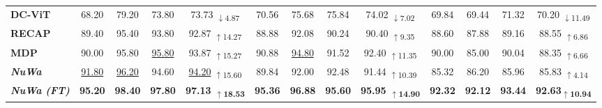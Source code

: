 \begin{table}[t]
\begin{scriptsize}
\begin{tabular}{l||ccc|c||ccc|c||ccc|c}
\textbf{DC-ViT} & 68.20 & 79.20 & 73.80 & 73.73 \textsubscript{\textcolor{downblue}{$\downarrow$4.87}} & 70.56 & 75.68 & 75.84 & 74.02 \textsubscript{\textcolor{downblue}{$\downarrow$7.02}} & 69.84 & 69.44 & 71.32 & 70.20 \textsubscript{\textcolor{downblue}{$\downarrow$11.49}}\\
\rowcolor[gray]{0.95}
\textbf{RECAP} & 89.40 & 95.40 & 93.80 & 92.87 \textsubscript{\textcolor{upred}{$\uparrow$14.27}} & 88.88 & 92.08 & 90.24 & 90.40 \textsubscript{\textcolor{upred}{$\uparrow$9.35}} & 88.60 & 87.88 & 89.16 & 88.55 \textsubscript{\textcolor{upred}{$\uparrow$6.86}}\\
\textbf{MDP} & 90.00 & 95.80 & \underline{95.80} & 93.87 \textsubscript{\textcolor{upred}{$\uparrow$15.27}} & 90.88 & \underline{94.80} & 91.52 & 92.40 \textsubscript{\textcolor{upred}{$\uparrow$11.35}} & 90.00 & 85.00 & 90.04 & 88.35 \textsubscript{\textcolor{upred}{$\uparrow$6.66}}\\
\hline\rowcolor[HTML]{FFF2E0}
\textbf{\textit{NuWa}} & \underline{91.80} & \underline{96.20} & 94.60 & \underline{94.20} \textsubscript{\textcolor{upred}{$\uparrow$15.60}} & 89.84 & 92.00 & 92.48 & 91.44 \textsubscript{\textcolor{upred}{$\uparrow$10.39}} & 85.32 & 86.20 & 85.96 & 85.83 \textsubscript{\textcolor{upred}{$\uparrow$4.14}}\\
\rowcolor[HTML]{FFF6E2}
\textbf{\textit{NuWa (FT)}} & \textbf{95.20} & \textbf{98.40} & \textbf{97.80} & \textbf{97.13 \textsubscript{\textcolor{upred}{$\uparrow$18.53}}} & \textbf{95.36} & \textbf{96.88} & \textbf{95.60} & \textbf{95.95 \textsubscript{\textcolor{upred}{$\uparrow$14.90}}} & \textbf{92.32} & \textbf{92.12} & \textbf{93.44} & \textbf{92.63\textsubscript{\textcolor{upred}{$\uparrow$10.94}}}\\
\hline
\bottomrule
\end{tabular}
\end{scriptsize}
\vskip -0.15in
\end{table}

